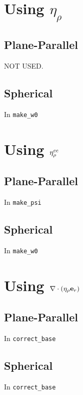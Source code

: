 \documentclass[11pt]{article}
\def\eb         {{\bf e}}
\def\etarho     {\eta_\rho}
\def\etarhocc   {\etarho^{\rm cc}}
\def\divetarho  {\nabla\cdot(\etarho\eb_r)}
\begin{document}
\section{Using $\etarho$}
\subsection{Plane-Parallel}
NOT USED.
\subsection{Spherical}
In {\tt make\_w0}
\section{Using $\etarhocc$}
\subsection{Plane-Parallel}
In {\tt make\_psi}
\subsection{Spherical}
In {\tt make\_w0}
\section{Using $\divetarho$}
\subsection{Plane-Parallel}
In {\tt correct\_base}
\subsection{Spherical}
In {\tt correct\_base}
\end{document}
